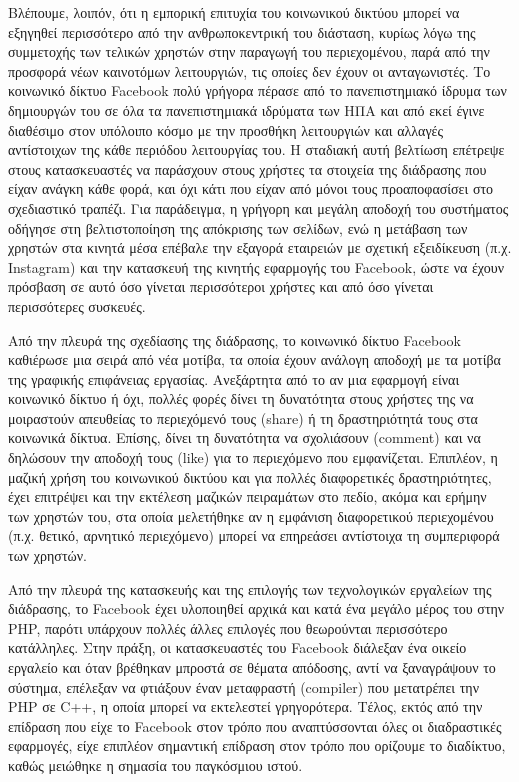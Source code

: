 \documentclass[
]{article}
\begin{document}
Βλέπουμε, λοιπόν, ότι η εμπορική επιτυχία του κοινωνικού δικτύου μπορεί
να εξηγηθεί περισσότερο από την ανθρωποκεντρική του διάσταση, κυρίως
λόγω της συμμετοχής των τελικών χρηστών στην παραγωγή του περιεχομένου,
παρά από την προσφορά νέων καινοτόμων λειτουργιών, τις οποίες δεν έχουν
οι ανταγωνιστές. Το κοινωνικό δίκτυο Facebook πολύ γρήγορα πέρασε από το
πανεπιστημιακό ίδρυμα των δημιουργών του σε όλα τα πανεπιστημιακά
ιδρύματα των ΗΠΑ και από εκεί έγινε διαθέσιμο στον υπόλοιπο κόσμο με την
προσθήκη λειτουργιών και αλλαγές αντίστοιχων της κάθε περιόδου
λειτουργίας του. Η σταδιακή αυτή βελτίωση επέτρεψε στους κατασκευαστές
να παράσχουν στους χρήστες τα στοιχεία της διάδρασης που είχαν ανάγκη
κάθε φορά, και όχι κάτι που είχαν από μόνοι τους προαποφασίσει στο
σχεδιαστικό τραπέζι. Για παράδειγμα, η γρήγορη και μεγάλη αποδοχή του
συστήματος οδήγησε στη βελτιστοποίηση της απόκρισης των σελίδων, ενώ η
μετάβαση των χρηστών στα κινητά μέσα επέβαλε την εξαγορά εταιρειών με
σχετική εξειδίκευση (π.χ. Ιnstagram) και την κατασκευή της κινητής
εφαρμογής του Facebook, ώστε να έχουν πρόσβαση σε αυτό όσο γίνεται
περισσότεροι χρήστες και από όσο γίνεται περισσότερες συσκευές.

Από την πλευρά της σχεδίασης της διάδρασης, το κοινωνικό δίκτυο Facebook
καθιέρωσε μια σειρά από νέα μοτίβα, τα οποία έχουν ανάλογη αποδοχή με τα
μοτίβα της γραφικής επιφάνειας εργασίας. Ανεξάρτητα από το αν μια
εφαρμογή είναι κοινωνικό δίκτυο ή όχι, πολλές φορές δίνει τη δυνατότητα
στους χρήστες της να μοιραστούν απευθείας το περιεχόμενό τους (share) ή
τη δραστηριότητά τους στα κοινωνικά δίκτυα. Επίσης, δίνει τη δυνατότητα
να σχολιάσουν (comment) και να δηλώσουν την αποδοχή τους (like) για το
περιεχόμενο που εμφανίζεται. Επιπλέον, η μαζική χρήση του κοινωνικού
δικτύου και για πολλές διαφορετικές δραστηριότητες, έχει επιτρέψει και
την εκτέλεση μαζικών πειραμάτων στο πεδίο, ακόμα και ερήμην των χρηστών
του, στα οποία μελετήθηκε αν η εμφάνιση διαφορετικού περιεχομένου (π.χ.
θετικό, αρνητικό περιεχόμενο) μπορεί να επηρεάσει αντίστοιχα τη
συμπεριφορά των χρηστών.

Από την πλευρά της κατασκευής και της επιλογής των τεχνολογικών
εργαλείων της διάδρασης, το Facebook έχει υλοποιηθεί αρχικά και κατά ένα
μεγάλο μέρος του στην PHP, παρότι υπάρχουν πολλές άλλες επιλογές που
θεωρούνται περισσότερο κατάλληλες. Στην πράξη, οι κατασκευαστές του
Facebook διάλεξαν ένα οικείο εργαλείο και όταν βρέθηκαν μπροστά σε
θέματα απόδοσης, αντί να ξαναγράψουν το σύστημα, επέλεξαν να φτιάξουν
έναν μεταφραστή (compiler) που μετατρέπει την PHP σε C++, η οποία μπορεί
να εκτελεστεί γρηγορότερα. Τέλος, εκτός από την επίδραση που είχε το
Facebook στον τρόπο που αναπτύσσονται όλες οι διαδραστικές εφαρμογές,
είχε επιπλέον σημαντική επίδραση στον τρόπο που ορίζουμε το διαδίκτυο,
καθώς μειώθηκε η σημασία του παγκόσμιου ιστού.
\end{document}
